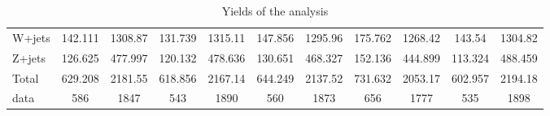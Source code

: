 \documentclass[10pt]{article}
\begin{document}
\begin{table}[htbp]
\begin{center}
\begin{tabular}{|l|S|S|S|S|S|S|S|S|S|S|}
  W+jets   & 142.111  & 1308.87  & 131.739  & 1315.11  & 147.856  & 1295.96  & 175.762  & 1268.42  & 143.54  & 1304.82  \\ 
  Z+jets   & 126.625  & 477.997  & 120.132  & 478.636  & 130.651  & 468.327  & 152.136  & 444.899  & 113.324  & 488.459  \\ 
\hline 
  Total  & 629.208  & 2181.55  & 618.856  & 2167.14  & 644.249  & 2137.52  & 731.632  & 2053.17  & 602.957  & 2194.18  \\ 
\hline 
  data   & 586 & 1847 & 543 & 1890 & 560 & 1873 & 656 & 1777 & 535 & 1898 \\ 
\hline 
\end{tabular} 
\caption{Yields of the analysis} 
\end{center} 
\end{table} 
\end{document}
